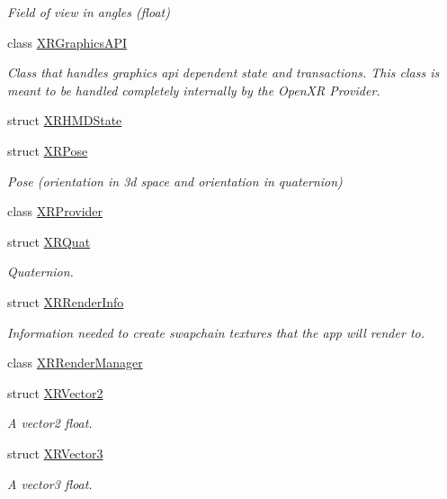 \begin{DoxyCompactItemize}
\begin{DoxyCompactList}\small\item\em Field of view in angles (float) \end{DoxyCompactList}\item 
class \mbox{\hyperlink{class_open_x_r_provider_1_1_x_r_graphics_a_p_i}{X\+R\+Graphics\+A\+PI}}
\begin{DoxyCompactList}\small\item\em Class that handles graphics api dependent state and transactions. This class is meant to be handled completely internally by the Open\+XR Provider. \end{DoxyCompactList}\item 
struct \mbox{\hyperlink{struct_open_x_r_provider_1_1_x_r_h_m_d_state}{X\+R\+H\+M\+D\+State}}
\item 
struct \mbox{\hyperlink{struct_open_x_r_provider_1_1_x_r_pose}{X\+R\+Pose}}
\begin{DoxyCompactList}\small\item\em Pose (orientation in 3d space and orientation in quaternion) \end{DoxyCompactList}\item 
class \mbox{\hyperlink{class_open_x_r_provider_1_1_x_r_provider}{X\+R\+Provider}}
\item 
struct \mbox{\hyperlink{struct_open_x_r_provider_1_1_x_r_quat}{X\+R\+Quat}}
\begin{DoxyCompactList}\small\item\em Quaternion. \end{DoxyCompactList}\item 
struct \mbox{\hyperlink{struct_open_x_r_provider_1_1_x_r_render_info}{X\+R\+Render\+Info}}
\begin{DoxyCompactList}\small\item\em Information needed to create swapchain textures that the app will render to. \end{DoxyCompactList}\item 
class \mbox{\hyperlink{class_open_x_r_provider_1_1_x_r_render_manager}{X\+R\+Render\+Manager}}
\item 
struct \mbox{\hyperlink{struct_open_x_r_provider_1_1_x_r_vector2}{X\+R\+Vector2}}
\begin{DoxyCompactList}\small\item\em A vector2 float. \end{DoxyCompactList}\item 
struct \mbox{\hyperlink{struct_open_x_r_provider_1_1_x_r_vector3}{X\+R\+Vector3}}
\begin{DoxyCompactList}\small\item\em A vector3 float. \end{DoxyCompactList}\end{DoxyCompactItemize}
